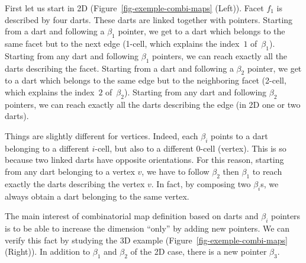 First let us start in 2D (Figure~\ref{fig-exemple-combi-maps} (Left)).
Facet $f_1$ is described by four darts. These darts are linked
together with pointers. Starting from a dart and following a $\beta_1$
pointer, we get to a dart which belongs to the same facet but to the
next edge (1-cell, which explains the index~$1$ of~$\beta_1$).
Starting from any dart and following $\beta_1$ pointers, we can reach
exactly all the darts describing the facet.  Starting from a dart and
following a $\beta_2$ pointer, we get to a dart which belongs to the
same edge but to the neighboring facet (2-cell, which explains the
index~$2$ of~$\beta_2$).  Starting from any dart and following
$\beta_2$ pointers, we can reach exactly all the darts describing the
edge (in 2D one or two darts).

Things are slightly different for vertices.  Indeed, each $\beta_i$
points to a dart belonging to a different $i$-cell, but also to a
different $0$-cell (vertex).  This is so because two linked darts have
opposite orientations.  For this reason, starting from any dart
belonging to a vertex $v$, we have to follow $\beta_2$ then $\beta_1$
to reach exactly the darts describing the vertex $v$.  In fact, by
composing two $\beta_i$s, we always obtain a dart belonging to the
same vertex.

The main interest of combinatorial map definition based on darts and
$\beta_i$ pointers is to be able to increase the dimension ``only'' by
adding new pointers. We can verify this fact by studying the 3D
example (Figure~\ref{fig-exemple-combi-maps} (Right)). In addition to
$\beta_1$ and $\beta_2$ of the 2D case, there is a new pointer
$\beta_3$.

